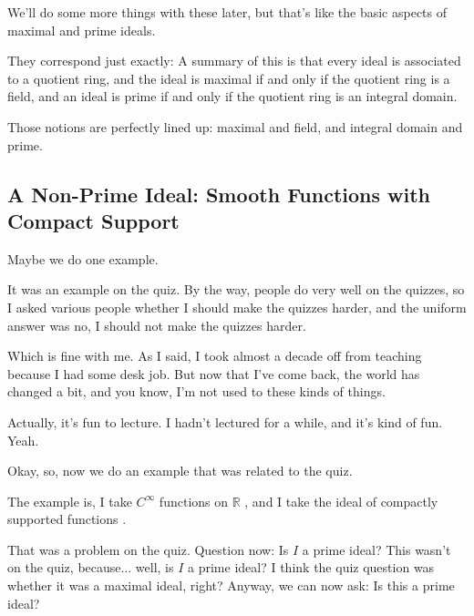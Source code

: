 \begin{speech}[01:03:02 - 01:03:44]
We'll do some more things with these later, but that's like the basic aspects of maximal and prime ideals.

They correspond just exactly: A summary of this is that every ideal is associated to a quotient ring, and the ideal is maximal if and only if the quotient ring is a field, and an ideal is prime if and only if the quotient ring is an integral domain.

Those notions are perfectly lined up: maximal and field, and integral domain and prime.
\end{speech}

\subsection{A Non-Prime Ideal: Smooth Functions with Compact Support}

\begin{speech}[01:03:44 - 01:04:41]
Maybe we do one example.

It was an example on the quiz. By the way, people do very well on the quizzes, so I asked various people whether I should make the quizzes harder, and the uniform answer was no, I should not make the quizzes harder. 

Which is fine with me. As I said, I took almost a decade off from teaching because I had some desk job. But now that I've come back, the world has changed a bit, and you know, I'm not used to these kinds of things.

Actually, it's fun to lecture. I hadn't lectured for a while, and it's kind of fun. Yeah.
\end{speech}

\begin{speech}[01:04:41 - 01:05:40]
Okay, so, now we do an example that was related to the quiz.

The example is, I take $C^\infty$ functions on $\mathbb{R}$ , and I take the ideal of compactly supported functions .

That was a problem on the quiz. Question now: Is $I$ a prime ideal?  This wasn't on the quiz, because... well, is $I$ a prime ideal? I think the quiz question was whether it was a maximal ideal, right? Anyway, we can now ask: Is this a prime ideal?
\end{speech}

